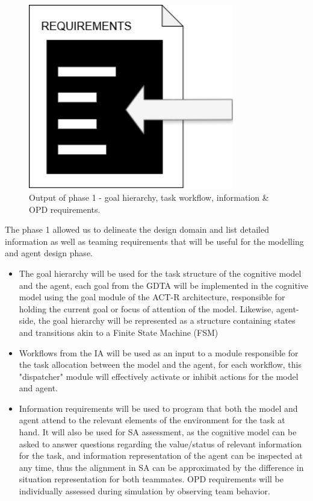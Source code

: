 \documentclass[12pt,a4paper]{article} %
\begin{document}
\begin{figure}[h!]
\begin{minipage}[b]{0.3\textwidth}
			\includegraphics[width=0.8\textwidth]{images/requirements.png}
		\end{minipage}
		\caption{Output of phase 1 - goal hierarchy, task workflow, information \& OPD requirements.}
		\label{fig:logos}
	\end{figure}
	The phase 1 allowed us to delineate the design domain and list detailed information as well as teaming requirements that will be useful for the modelling and agent design phase.
	\begin{itemize}
		\item The goal hierarchy will be used for the task structure of the cognitive model and the agent, each goal from the GDTA will be implemented in the cognitive model using the goal module of the ACT-R architecture, responsible for holding the current goal or focus of attention of the model. Likewise, agent-side, the goal hierarchy will be represented as a structure containing states and transitions akin to a Finite State Machine (FSM)
		\item Workflows from the IA will be used as an input to a module responsible for the task allocation between the model and the agent, for each workflow, this "dispatcher" module will effectively activate or inhibit actions for the model and agent.
		\item Information requirements will be used to program that both the model and agent attend to the relevant elements of the environment for the task at hand. It will also be used for SA assessment, as the cognitive model can be asked to answer questions regarding the value/status of relevant information for the task, and information representation of the agent can be inspected at any time, thus the alignment in SA can be approximated by the difference in situation representation for both teammates. OPD requirements will be individually assessed during simulation by observing team behavior.
	\end{itemize}
\end{document}
